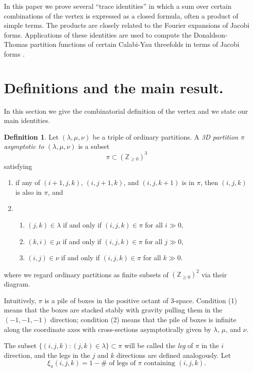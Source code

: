 \documentclass[12pt]{amsart}
\newcommand{\znums} {{\mathbb Z}}		%
\theoremstyle{definition}
\newtheorem{defn}[theorem]{Definition}
\begin{document}
In this paper we prove several ``trace identities'' in which a sum
over certain combinations of the vertex is expressed as a closed
formula, often a product of simple terms. The products are closely
related to the Fourier expansions of Jacobi forms. Applications of
these identities are used to compute the Donaldson-Thomas partition
functions of certain Calabi-Yau threefolds in terms of Jacobi forms
\cite{Bryan-Kool,Bryan-K3xE,BOPY}.

\section{Definitions and the main result.}\label{sec: defns and
result}

In this section we give the combinatorial definition of the vertex and
we state our main identities.

\begin{defn}\label{defn: 3D partition asympt to (a,b,c)} Let $(\lambda
,\mu ,\nu )$ be a triple of ordinary partitions. A \emph{3D
partition $\pi $ asymptotic to $(\lambda ,\mu ,\nu )$} is a subset
\[
\pi \subset \left(\znums _{\geq 0} \right)^{3}
\]
satisfying
\begin{enumerate}
\item if any of $(i+1,j,k)$, $(i,j+1,k)$, and $(i,j,k+1)$ is in $\pi
$, then $(i,j,k)$ is also in $\pi $, and
\item
\begin{enumerate}
\item $(j,k)\in \lambda $ if and only if $(i,j,k)\in \pi $ for all $i\gg 0$,
\item $(k,i)\in \mu  $ if and only if $(i,j,k)\in \pi $ for all $j\gg 0$,
\item $(i,j)\in \nu  $ if and only if $(i,j,k)\in \pi $ for all $k\gg 0$.
\end{enumerate}
\end{enumerate}
where we regard ordinary partitions as finite subsets of $\left(\znums
_{\geq 0} \right)^{2}$ via their diagram.
\end{defn}

Intuitively, $\pi $ is a pile of boxes in the positive octant of
3-space.  Condition (1) means that the boxes are stacked stably with
gravity pulling them in the $(-1,-1,-1)$ direction; condition (2)
means that the pile of boxes is infinite along the coordinate axes
with cross-sections asymptotically given by $\lambda $, $\mu $, and
$\nu $.

The subset $\{(i,j,k ): (j,k)\in \lambda \}\subset \pi $ will be
called the \emph{leg} of $\pi $ in the $i$ direction, and the legs in
the $j$ and $k$ directions are defined analogously. Let
\begin{equation*}
\xi _{\pi } (i,j,k) = 1 - \# \text{ of legs of $\pi $ containing }
(i,j,k) .
\end{equation*}
\end{document}
